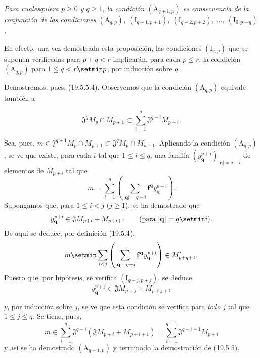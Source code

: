 \begin{env}[19.5.5.4]
\label{IV.19.5.5.4}
\emph{Para cualesquiera $p\geq0$ y $q\geq1$, la condición $(\mathrm A_{q+1,p})$ es consecuencia de la conjunción de las condiciones $(\mathrm A_{q,p})$, $(\mathrm I_{q-1,p+1})$, $(\mathrm I_{q-2,p+2})$, $\ldots$, $(\mathrm I_{0,p+q})$.}

En efecto, una vez demostrada esta proposición, las condiciones $(\mathrm I_{q,p})$ que se suponen verificadas para $p+q<r$ implicarán, para cada $p\leq r$, la condición $(\mathrm A_{q,p})$ para $1\leq q<r\setmin p$, por inducción sobre $q$.

Demostremos, pues, (19.5.5.4). Observemos que la condición $(\mathrm A_{q,p})$ equivale también a
\end{env}



\begin{equation}
  \mathfrak J^qM_p\cap M_{p+1}\subset\sum_{i=1}^q\mathfrak J^{q-i}M_{p+i}.
  \tag{19.5.5.5}\label{IV.19.5.5.5}
\end{equation}

Sea, pues, $m\in\mathfrak J^{q+1}M_p\cap M_{p+1}\subset\mathfrak J^qM_p\cap M_{p+1}$. Aplicando la condición $(\mathrm A_{q,p})$, se ve que existe, para cada $i$ tal que $1\leq i\leq q$, una familia $(y_{\mathbf q}^{p+i})_{|\mathbf q|=q-i}$ de elementos de $M_{p+i}$ tal que
\[
  m=\sum_{i=1}^q\left(\sum_{|\mathbf q|=q-i}\mathbf f^{\mathbf q}y_{\mathbf q}^{p+i}\right).
\]
Supongamos que, para $1\leq i<j$ ($j\geq1$), se ha demostrado que
\[
  y_{\mathbf q}^{p+i}\in\mathfrak JM_{p+i}+M_{p+i+1}\qquad(\text{para }|\mathbf q|=q\setmin i).
\]
De aquí se deduce, por definición (19.5.4),
\[
  m\setmin\sum_{i<j}\left(\sum_{|\mathbf q|=q-i}\mathbf f^{\mathbf q}y_{\mathbf q}^{p+i}\right)\in M_{p+q+1}'.
\]
Puesto que, por hipótesis, se verifica $(\mathrm I_{q-j,p+j})$, se deduce
\[
  y_{\mathbf q}^{p+j}\in\mathfrak JM_{p+j}+M_{p+j+1}
\]


y, por inducción sobre $j$, se ve que esta condición se verifica para \emph{todo} $j$ tal que $1\leq j\leq q$. Se tiene, pues,
\[
  m\in\sum_{i=1}^q\mathfrak J^{q-i}(\mathfrak JM_{p+i}+M_{p+i+1})=\sum_{i=1}^{q+1}\mathfrak J^{q-i+1}M_{p+i}
\]
y así se ha demostrado $(\mathrm A_{q+1,p})$ y terminado la demostración de (19.5.5).


